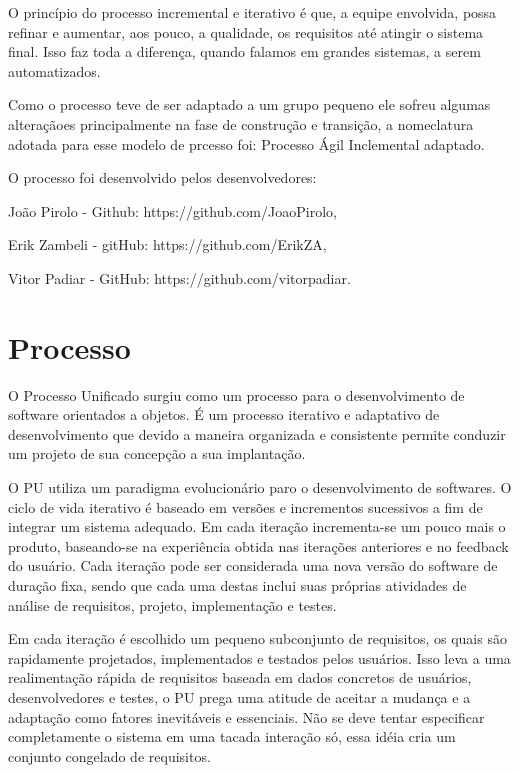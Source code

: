\documentclass[	DIV=calc,%
							paper=a4,%
							fontsize=12pt,%
							onecolumn]{scrartcl}	 					%
\begin{document}
O princípio do processo incremental e iterativo é que, a equipe envolvida, possa refinar e aumentar,  aos pouco, a qualidade, os requisitos até atingir o sistema final.  Isso faz toda a diferença, quando falamos em grandes sistemas, a serem automatizados.   

Como o processo teve de ser adaptado a um grupo pequeno ele sofreu algumas alteraçãoes principalmente na fase de construção e transição, a nomeclatura adotada para esse modelo de prcesso foi: Processo Ágil Inclemental adaptado.

O processo foi desenvolvido pelos desenvolvedores:
\begin{itemize}
{\item João Pirolo - Github: https://github.com/JoaoPirolo,
\item Erik Zambeli - gitHub: https://github.com/ErikZA, 
\item Vitor Padiar - GitHub: https://github.com/vitorpadiar.}
\end{itemize} 
\section{Processo}

 O Processo Unificado surgiu como um processo para o desenvolvimento de software orientados a objetos. É um processo iterativo e adaptativo de desenvolvimento que devido a maneira organizada e consistente permite conduzir um projeto de sua concepção a sua implantação.
 
 O PU utiliza um paradigma evolucionário paro o desenvolvimento de softwares. O ciclo de vida iterativo é baseado em versões e incrementos sucessivos a fim de integrar um sistema adequado. Em cada iteração incrementa-se um pouco mais o produto, baseando-se na experiência obtida nas iterações anteriores e no feedback do usuário. Cada iteração pode ser considerada uma nova versão do software de duração fixa, sendo que cada uma destas inclui suas próprias atividades de análise de requisitos, projeto, implementação e testes.
 
  Em cada iteração é escolhido um pequeno subconjunto de requisitos, os quais são rapidamente projetados, implementados e testados pelos usuários. Isso leva a uma realimentação rápida de requisitos baseada em dados concretos de usuários, desenvolvedores e testes, o PU prega uma atitude de aceitar a mudança e a adaptação como fatores inevitáveis e essenciais. Não se deve tentar especificar completamente o sistema em uma tacada interação só, essa idéia cria um conjunto congelado de requisitos.
 
\end{document}

